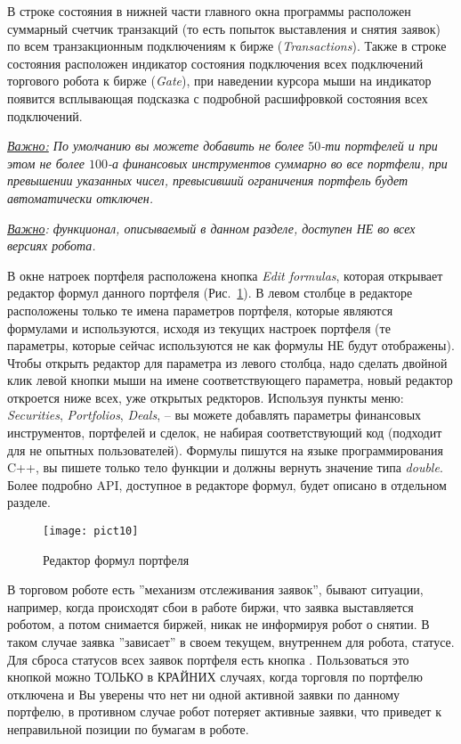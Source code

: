 В строке состояния в нижней части главного окна программы расположен суммарный счетчик транзакций (то есть попыток выставления и снятия заявок) по всем транзакционным
подключениям к бирже (\textit{Transactions}). Также в строке состояния расположен индикатор состояния подключения всех подключений торгового робота к бирже (\textit{Gate}),
при наведении курсора мыши на индикатор появится всплывающая подсказка с подробной расшифровкой состояния всех подключений.\newline

\noindent\textit{\underline{Важно:} По умолчанию вы можете добавить не более $50$-ти портфелей и при этом не более $100$-а финансовых инструментов суммарно во все портфели,
при превышении указанных чисел, превысивший ограничения портфель будет автоматически отключен.}


\ifdefined \Ramiz
\else
\noindent\textit{\underline{Важно}: функционал, описываемый в данном разделе, доступен НЕ во всех версиях робота.\newline}
\fi

В окне натроек портфеля расположена кнопка \textit{Edit formulas}, которая открывает редактор формул данного портфеля (Рис.~\ref{fig:edit_formulas}). В левом
столбце в редакторе расположены только те имена параметров портфеля, которые являются формулами и используются, исходя из текущих настроек портфеля (те параметры,
которые сейчас используются не как формулы НЕ будут отображены). Чтобы открыть
редактор для параметра из левого столбца, надо сделать двойной клик левой кнопки мыши на имене соответствующего параметра, новый редактор откроется ниже всех,
уже открытых редкторов. Используя пункты меню: \textit{Securities}, \textit{Portfolios}, \textit{Deals}, -- вы можете добавлять параметры финансовых инструментов,
портфелей и сделок, не набирая соответствующий код (подходит для не опытных пользователей). Формулы пишутся на языке программирования C++, вы пишете только
тело функции и должны вернуть значение типа \textit{double}. Более подробно API, доступное в редакторе формул, будет описано в отдельном разделе.

\begin{figure}[h!]
\centering
\texttt{[image: pict10]}
\caption{Редактор формул портфеля}
\label{fig:edit_formulas}
\end{figure}


В торговом роботе есть ''механизм отслеживания заявок'', бывают ситуации, например, когда происходят сбои в работе биржи, что заявка выставляется роботом, а потом снимается
биржей, никак не информируя робот о снятии. В таком случае заявка ''зависает'' в своем текущем, внутреннем для робота, статусе. Для сброса статусов всех заявок портфеля есть
кнопка . Пользоваться это кнопкой можно ТОЛЬКО в КРАЙНИХ случаях, когда торговля по портфелю отключена и Вы уверены что нет ни одной
активной заявки по данному портфелю, в противном случае робот потеряет активные заявки, что приведет к неправильной позиции по бумагам в роботе.

